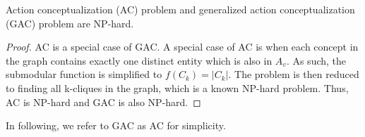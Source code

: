 %
\begin{lemma}
Action conceptualization (AC) problem and generalized action
conceptualization (GAC) problem are NP-hard.
\end{lemma}
\begin{proof}
AC is a special case of GAC.
A special case of AC is when each concept in the graph
contains exactly one distinct entity which is also in $A_v$.
As such, the submodular function is simplified to $f(C_k) = |C_k|$.
The problem is then reduced to finding all k-cliques in the graph,
which is a known NP-hard problem\cite{Vassilevska2009254}.
Thus, AC is NP-hard and GAC is also NP-hard.
\end{proof}

In following, we refer to GAC as AC for simplicity.

